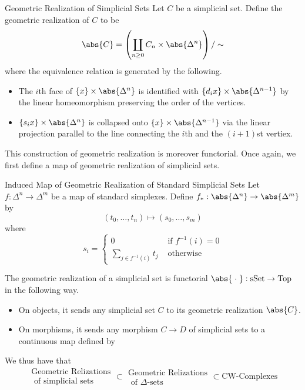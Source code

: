 \documentclass[a4paper]{article}
\begin{document}
\begin{defn}{Geometric Realization of Simplicial Sets}{} Let $C$ be a simplicial set. Define the geometric realization of $C$ to be $$\abs{C}=\left(\coprod_{n\geq 0}C_n\times\abs{\Delta^n}\right)/\sim$$ where the equivalence relation is generated by the following. 
\begin{itemize}
\item The $i$th face of $\{x\}\times\abs{\Delta^n}$ is identified with $\{d_ix\}\times\abs{\Delta^{n-1}}$ by the linear homeomorphism preserving the order of the vertices. 
\item $\{s_ix\}\times\abs{\Delta^n}$ is collapsed onto $\{x\}\times\abs{\Delta^{n-1}}$ via the linear projection parallel to the line connecting the $i$th and the $(i+1)$st vertiex. 
\end{itemize}
\end{defn}

This construction of geometric realization is moreover functorial. Once again, we first define a map of geometric realization of simplicial sets. 

\begin{defn}{Induced Map of Geometric Realization of Standard Simplicial Sets}{} Let $f:\Delta^n\to\Delta^m$ be a map of standard simplexes. Define $f_\ast:\abs{\Delta^n}\to\abs{\Delta^m}$ by $$(t_0,\dots,t_n)\mapsto(s_0,\dots,s_m)$$ where $$s_i=\begin{cases}
0 & \text{ if } f^{-1}(i)=0\\
\sum_{j\in f^{-1}(i)}t_j & \text{ otherwise }
\end{cases}$$
\end{defn}

\begin{thm}{}{} The geometric realization of a simplicial set is functorial $\abs{\;\cdot\;}:\text{sSet}\to\text{Top}$ in the following way. 
\begin{itemize}
\item On objects, it sends any simplicial set $C$ to its geometric realization $\abs{C}$. 
\item On morphisms, it sends any morphism $C\to D$ of simplicial sets to a continuous map defined by 
\end{itemize}
\end{thm}

We thus have that $$\substack{\text{Geometric Relizations}\\\text{ of simplicial sets}}\subset\substack{\text{Geometric Relizations}\\\text{ of }\Delta\text{-sets}}\subset\text{CW-Complexes}$$
\end{document}
